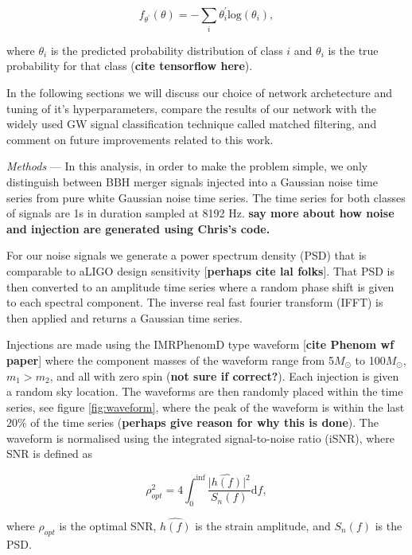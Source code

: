\documentclass[%
 amsmath,amssymb,
 aps,
 twocolumn,
 prl,
 reprint,
floatfix,
]{revtex4-1}
\begin{document}
\begin{equation} \label{eq:loss}
f_{\theta^{'}}(\theta) = -\sum_{i} \theta_{i}^{'} \mathrm{log}(\theta_{i}),
\end{equation}

where $\theta_{i}$ is the predicted probability distribution of class $i$ and $\theta_{i}$ is the true probability for that class (\textbf{cite tensorflow here}). 

In the following sections we will discuss our choice of network archetecture and tuning of it's hyperparameters, compare the results of our network with the widely used GW signal classification technique called matched filtering, and comment on future improvements related to this work.      

\textit{Methods} --- In this analysis, in order to make the problem simple, we only distinguish between BBH merger signals injected into a Gaussian noise time series from pure white Gaussian noise time series. The time series for both classes of signals are 1s in duration sampled at 8192 Hz. \textbf{say more about how noise and injection are generated using Chris's code.} 

For our noise signals we generate a power spectrum density (PSD) that is comparable to aLIGO design sensitivity [\textbf{perhaps cite lal folks}]. That PSD is then converted to an amplitude time series where a random phase shift is given to each spectral component. The inverse real fast fourier transform (IFFT) is then applied and returns a Gaussian time series.

Injections are made using the IMRPhenomD type waveform [\textbf{cite Phenom wf paper}] where the component masses of the waveform range from 5\(M_\odot\) to 100\(M_\odot\), $m_{1} > m_{2}$, and all with zero spin (\textbf{not sure if correct?}). Each injection is given a random sky location. The waveforms are then randomly placed within the time series, see figure \ref{fig:waveform}, where the peak of the waveform is within the last $20$\% of the time series (\textbf{perhaps give reason for why this is done}). The waveform is normalised using the integrated signal-to-noise ratio (iSNR), where SNR is defined as

\begin{equation} \label{eq:snr}
\rho_{opt}^{2} = 4 \int_{0}^{\inf} \frac{\lvert \hat{h(f)}\rvert^{2}}{S_{n}(f)} \mathrm{d}f,
\end{equation}

where $\rho_{opt}$ is the optimal SNR, $\hat{h(f)}$ is the strain amplitude, and $S_{n}(f)$ is the PSD.
\end{document}

